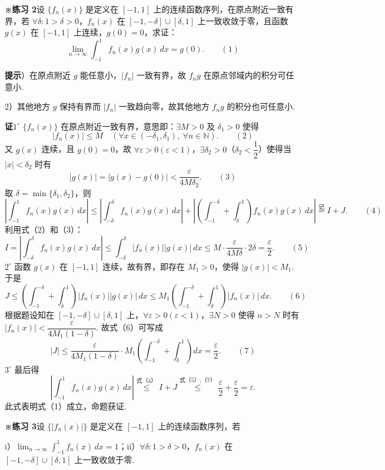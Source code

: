 \documentclass[UTF8, 12pt, fontset=fandol, oneside]{ctexart}
\begin{document}
\noindent\textbf{※练习 2}\quad 设 $\{f_n(x)\}$ 是定义在 $[-1,1]$ 上的连续函数序列，在原点附近一致有界，若
$\forall\delta:1>\delta>0$，$f_n(x)$ 在 $[-1,-\delta]\cup[\delta,1]$ 上一致收敛于零，且函数
$g(x)$ 在 $[-1,1]$ 上连续，$g(0)=0$，求证：
\[
  \lim_{n\to\infty}\int_{-1}^1 f_n(x)g(x)\,dx=g(0).
\qquad(1)
\]

\noindent\textbf{提示}）在原点附近 $g$ 能任意小，$|f_n|$ 一致有界，故 $f_ng$ 在原点邻域内的积分可任意小.

2）其他地方 $g$ 保持有界而 $|f_n|$ 一致趋向零，故其他地方 $f_ng$ 的积分也可任意小.

\noindent\textbf{证}\quad $1^\circ$ $\{f_n(x)\}$ 在原点附近一致有界，意思即：$\exists M>0$ 及 $\delta_1>0$ 使得
\[
  |f_n(x)|\le M\quad(\forall x\in(-\delta_1,\delta_1),\ \forall n\in\mathbb N).
\qquad(2)
\]
又 $g(x)$ 连续，且 $g(0)=0$，故 $\forall\varepsilon>0(\varepsilon<1)$，$\exists\delta_2>0$（$\delta_2<\dfrac12$）使得当
$|x|<\delta_2$ 时有
\[
  |g(x)|=|g(x)-g(0)|<\frac{\varepsilon}{4M\delta_2}.
\qquad(3)
\]
取 $\delta=\min\{\delta_1,\delta_2\}$，则
\[
\left|\int_{-1}^1 f_n(x)g(x)\,dx\right|
\le\left|\int_{-\delta}^{\delta}f_n(x)g(x)\,dx\right|
+\left|\left(\int_{-1}^{-\delta}+\int_{\delta}^1\right)f_n(x)g(x)\,dx\right|
\overset{\text{记}}=I+J.
\qquad(4)
\]
利用式（2）和（3）：
\[
  I=\left|\int_{-\delta}^{\delta}f_n(x)g(x)\,dx\right|
  \le\int_{-\delta}^{\delta}|f_n(x)||g(x)|\,dx
  \le M\cdot\frac{\varepsilon}{4M\delta}\cdot2\delta
  =\frac\varepsilon2.
\qquad(5)
\]
$2^\circ$ 函数 $g(x)$ 在 $[-1,1]$ 连续，故有界，即存在 $M_1>0$，使得 $|g(x)|<M_1$. 于是
\[
  J\le\left(\int_{-1}^{-\delta}+\int_{\delta}^1\right)|f_n(x)||g(x)|\,dx
  \le M_1\left(\int_{-1}^{-\delta}+\int_{\delta}^1\right)|f_n(x)|\,dx.
\qquad(6)
\]
根据题设知在 $[-1,-\delta]\cup[\delta,1]$ 上，$\forall\varepsilon>0(\varepsilon<1)$，$\exists N>0$ 使得
$n>N$ 时有 $|f_n(x)|<\dfrac{\varepsilon}{4M_1(1-\delta)}$. 故式（6）可写成
\[
  |J|\le\frac{\varepsilon}{4M_1(1-\delta)}\cdot M_1\left(\int_{-1}^{-\delta}+\int_{\delta}^1\right)dx
  =\frac\varepsilon2.
\qquad(7)
\]
$3^\circ$ 最后得
\[
  \left|\int_{-1}^1 f_n(x)g(x)\,dx\right|
  \overset{\text{式（4）}}{\le} I+J
  \overset{\text{式（5）,（7）}}{\le}\frac\varepsilon2+\frac\varepsilon2=\varepsilon.
\]
此式表明式（1）成立，命题获证.

\noindent\textbf{※练习 3}\quad 设 $\{|f_n(x)|\}$ 是定义在 $[-1,1]$ 上的连续函数序列，若

i）$\displaystyle\lim_{n\to\infty}\int_{-1}^1 f_n(x)\,dx=1$；ii）$\forall\delta:1>\delta>0$，$f_n(x)$ 在
$[-1,-\delta]\cup[\delta,1]$ 上一致收敛于零.
\end{document}
